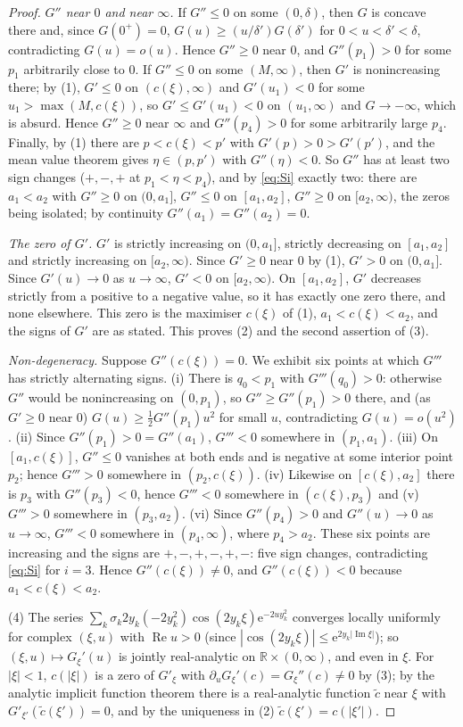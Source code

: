 \documentclass[11pt,a4paper]{article}
\theoremstyle{definition}
\theoremstyle{remark}
\newcommand{\R}{\mathbb{R}}
\newcommand{\ee}{\mathrm{e}}
\begin{document}
\begin{proof}
\emph{$G''$ near $0$ and near $\infty$.} If $G''\le0$ on some $(0,\delta)$, then $G$ is concave there and, since
$G(0^+)=0$, $G(u)\ge(u/\delta')G(\delta')$ for $0<u<\delta'<\delta$, contradicting $G(u)=o(u)$. Hence $G''\ge0$ near $0$,
and $G''(p_1)>0$ for some $p_1$ arbitrarily close to $0$. If $G''\le0$ on some $(M,\infty)$, then $G'$ is nonincreasing
there; by (1), $G'\le0$ on $(c(\xi),\infty)$ and $G'(u_1)<0$ for some $u_1>\max(M,c(\xi))$, so $G'\le G'(u_1)<0$ on
$(u_1,\infty)$ and $G\to-\infty$, which is absurd. Hence $G''\ge0$ near $\infty$ and $G''(p_4)>0$ for some arbitrarily
large $p_4$. Finally, by (1) there are $p<c(\xi)<p'$ with $G'(p)>0>G'(p')$, and the mean value theorem gives
$\eta\in(p,p')$ with $G''(\eta)<0$. So $G''$ has at least two sign changes ($+,-,+$ at $p_1<\eta<p_4$), and by
\eqref{eq:Si} exactly two: there are $a_1<a_2$ with $G''\ge0$ on $(0,a_1]$, $G''\le0$ on $[a_1,a_2]$, $G''\ge0$ on
$[a_2,\infty)$, the zeros being isolated; by continuity $G''(a_1)=G''(a_2)=0$.

\emph{The zero of $G'$.} $G'$ is strictly increasing on $(0,a_1]$, strictly decreasing on $[a_1,a_2]$ and strictly
increasing on $[a_2,\infty)$. Since $G'\ge0$ near $0$ by (1), $G'>0$ on $(0,a_1]$. Since $G'(u)\to0$ as $u\to\infty$,
$G'<0$ on $[a_2,\infty)$. On $[a_1,a_2]$, $G'$ decreases strictly from a positive to a negative value, so it has
exactly one zero there, and none elsewhere. This zero is the maximiser $c(\xi)$ of (1), $a_1<c(\xi)<a_2$, and the signs
of $G'$ are as stated. This proves (2) and the second assertion of (3).

\emph{Non-degeneracy.} Suppose $G''(c(\xi))=0$. We exhibit six points at which $G'''$ has strictly alternating signs.
(i) There is $q_0<p_1$ with $G'''(q_0)>0$: otherwise $G''$ would be nonincreasing on $(0,p_1)$, so $G''\ge G''(p_1)>0$
there, and (as $G'\ge0$ near $0$) $G(u)\ge\frac12G''(p_1)u^2$ for small $u$, contradicting $G(u)=o(u^2)$.
(ii) Since $G''(p_1)>0=G''(a_1)$, $G'''<0$ somewhere in $(p_1,a_1)$. (iii) On $[a_1,c(\xi)]$, $G''\le0$ vanishes at
both ends and is negative at some interior point $p_2$; hence $G'''>0$ somewhere in $(p_2,c(\xi))$. (iv) Likewise on
$[c(\xi),a_2]$ there is $p_3$ with $G''(p_3)<0$, hence $G'''<0$ somewhere in $(c(\xi),p_3)$ and (v) $G'''>0$ somewhere
in $(p_3,a_2)$. (vi) Since $G''(p_4)>0$ and $G''(u)\to0$ as $u\to\infty$, $G'''<0$ somewhere in $(p_4,\infty)$, where
$p_4>a_2$. These six points are increasing and the signs are $+,-,+,-,+,-$: five sign changes, contradicting
\eqref{eq:Si} for $i=3$. Hence $G''(c(\xi))\ne0$, and $G''(c(\xi))<0$ because $a_1<c(\xi)<a_2$.

(4) The series $\sum_k\sigma_k2y_k(-2y_k^2)\cos(2y_k\xi)\ee^{-2uy_k^2}$ converges locally uniformly for complex $(\xi,u)$
with $\operatorname{Re}u>0$ (since $|\cos(2y_k\xi)|\le\ee^{2y_k|\operatorname{Im}\xi|}$); so $(\xi,u)\mapsto G_\xi'(u)$ is
jointly real-analytic on $\R\times(0,\infty)$, and even in $\xi$. For $|\xi|<1$, $c(|\xi|)$ is a zero of $G'_\xi$ with
$\partial_uG_\xi'(c)=G_\xi''(c)\ne0$ by (3); by the analytic implicit function theorem there is a real-analytic
function $\tilde c$ near $\xi$ with $G'_{\xi'}(\tilde c(\xi'))=0$, and by the uniqueness in (2) $\tilde c(\xi')=c(|\xi'|)$.
\end{proof}
\end{document}
